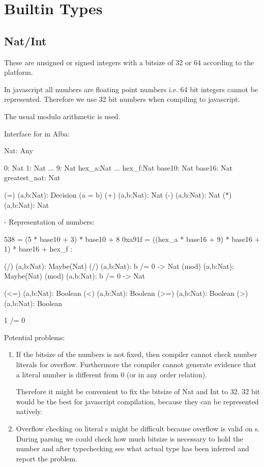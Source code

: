 \section{Builtin Types}


\subsection{Nat/Int}

These are unsigned or signed integers with a bitsize of 32 or 64 according to
the platform.

In javascript all numbers are floating point numbers i.e. 64 bit
integers cannot be represented. Therefore we use 32 bit numbers when compiling
to javascript.

The usual modulo arithmetic is used.

Interface for  in Alba:
%
\begin{alba}
    Nat: Any

    0: Nat
    1: Nat
    ...
    9: Nat
    hex_a:Nat
    ...
    hex_f:Nat
    base10:   Nat
    base16:   Nat
    greatest_nat: Nat

    (=) (a,b:Nat): Decision (a = b)
    (+) (a,b:Nat): Nat
    (-) (a,b:Nat): Nat
    (*) (a,b:Nat): Nat

    {- Representation of numbers:

      538    =  (5 * base10 + 3) * base10 + 8
      0xa91f =  ((hex_a * base16 + 9) * base16 + 1) * base16 + hex_f
    :}

    (/) (a,b:Nat): Maybe(Nat)
    (/) (a,b:Nat): b /= 0 -> Nat
    (mod) (a,b:Nat): Maybe(Nat)
    (mod) (a,b:Nat): b /= 0 -> Nat

    (<=) (a,b:Nat): Boolean
    (<)  (a,b:Nat): Boolean
    (>=) (a,b:Nat): Boolean
    (>)  (a,b:Nat): Boolean

    1 /= 0
\end{alba}


Potential problems:
\begin{enumerate}
\item If the bitsize of the numbers is not fixed, then compiler cannot check
  number literals for overflow. Furthermore the compiler cannot generate
  evidence that a literal number is different from 0 (or in any order
  relation).

  Therefore it might be convenient to fix the bitsize of Nat and Int to 32. 32
  bit would be the best for javascript compilation, because they can be
  represented natively.


\item Overflow checking on literal s might be difficult because
  overflow is valid on s. During parsing we could check how much
  bitsize is necessary to hold the number and after typechecking see what
  actual type has been inferred and report the problem.
\end{enumerate}








